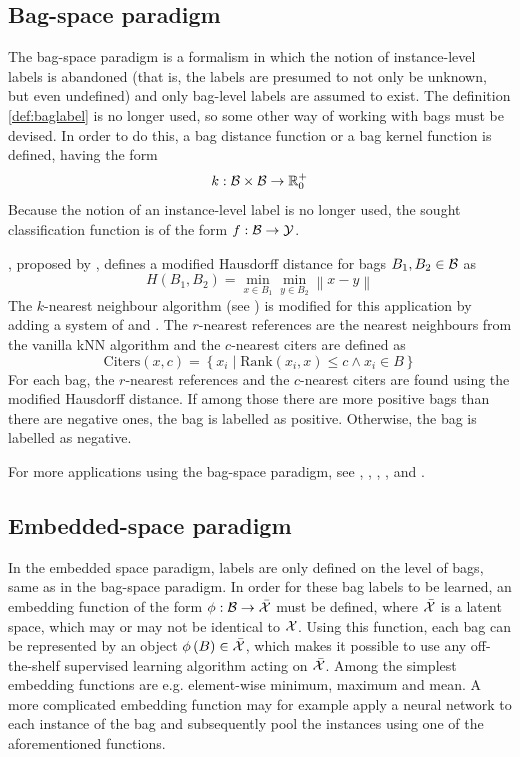\subsection{Bag-space paradigm}\label{sec:bag-space-paradigm}
The bag-space paradigm is a formalism in which the notion of instance-level labels is abandoned (that is, the labels are presumed to not only be unknown, but even undefined) and only bag-level labels are assumed to exist. The definition \ref{def:baglabel} is no longer used, so some other way of working with bags must be devised. In order to do this, a bag distance function or a bag kernel function is defined, having the form
\[ k : \mathcal{B} \times \mathcal{B} \to \mathbb{R}_0^+ \]
Because the notion of an instance-level label is no longer used, the sought classification function is of the form \( f : \mathcal{B} \to \mathcal{Y} \).

, proposed by \cite{wang_solving_2000}, defines a modified Hausdorff distance for bags \( B_1, B_2 \in \mathcal{B} \) as
\[ H \left( B_1, B_2 \right) = \min_{x \in B_1} \min_{y \in B_2} \left\lVert x - y \right\rVert \]
The \( k \)-nearest neighbour algorithm (see \cite{dasarathy_nearest_1991}) is modified for this application by adding a system of  and . The \( r \)-nearest references are the nearest neighbours from the vanilla kNN algorithm and the \( c \)-nearest citers are defined as
\[ \mathrm{Citers} \left( x, c \right) = \left\{ x_i \middle| \mathrm{Rank} \left( x_i, x \right) \leq c \wedge x_i \in B \right\} \]
For each bag, the \( r \)-nearest references and the \( c \)-nearest citers are found using the modified Hausdorff distance. If among those there are more positive bags than there are negative ones, the bag is labelled as positive. Otherwise, the bag is labelled as negative.

For more applications using the bag-space paradigm, see \cite{wang_solving_2000}, \cite{kwok_marginalized_2007}, \cite{gartner_multi-instance_2002}, \cite{haussler_convolution_1999}, \cite{zhou_multi-instance_2008} and \cite{muandet_learning_2012}.

\subsection{Embedded-space paradigm}\label{sec:embedded-space-paradigm}
In the embedded space paradigm, labels are only defined on the level of bags, same as in the bag-space paradigm. In order for these bag labels to be learned, an embedding function of the form \( \phi : \mathcal{B} \to \bar{\mathcal{X}} \) must be defined, where \( \bar{\mathcal{X}} \) is a latent space, which may or may not be identical to \( \mathcal{X} \). Using this function, each bag can be represented by an object \( \phi \left( B \right) \in \bar{\mathcal{X}} \), which makes it possible to use any off-the-shelf supervised learning algorithm acting on \( \bar{\mathcal{X}} \). Among the simplest embedding functions are e.g. element-wise minimum, maximum and mean. A more complicated embedding function may for example apply a neural network to each instance of the bag and subsequently pool the instances using one of the aforementioned functions.

